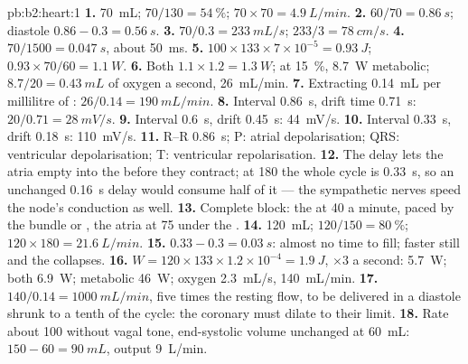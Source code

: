 \begin{solution}{pb:b2:heart:1}
\textbf{1.} \qty{70}{mL}; $70/130 = \qty{54}{\%}$; $70\times 70 =
\qty{4.9}{L/min}$.
\textbf{2.} $60/70 = \qty{0.86}{s}$; diastole $0.86 - 0.3 =
\qty{0.56}{s}$.
\textbf{3.} $70/0.3 = \qty{233}{mL/s}$; $233/3 = \qty{78}{cm/s}$.
\textbf{4.} $70/1500 = \qty{0.047}{s}$, about \qty{50}{ms}.
\textbf{5.} $100\times 133\times 7\times 10^{-5} = \qty{0.93}{J}$;
$0.93\times 70/60 = \qty{1.1}{W}$.
\textbf{6.} Both  $1.1\times 1.2 = \qty{1.3}{W}$; at
\qty{15}{\%}, \qty{8.7}{W} metabolic; $8.7/20 = \qty{0.43}{mL}$ of
oxygen a second, \qty{26}{mL/min}.
\textbf{7.} Extracting \qty{0.14}{mL} per millilitre of :
$26/0.14 = \qty{190}{mL/min}$.
\textbf{8.} Interval \qty{0.86}{s}, drift time \qty{0.71}{s}:
$20/0.71 = \qty{28}{mV/s}$.
\textbf{9.} Interval \qty{0.6}{s}, drift \qty{0.45}{s}: \qty{44}{mV/s}.
\textbf{10.} Interval \qty{0.33}{s}, drift \qty{0.18}{s}: \qty{110}{mV/s}.
\textbf{11.} R--R \qty{0.86}{s}; P: atrial depolarisation; QRS:
ventricular depolarisation; T: ventricular repolarisation.
\textbf{12.} The delay lets the atria empty into the 
before they contract; at 180 the whole cycle is \qty{0.33}{s}, so an
unchanged \qty{0.16}{s} delay would consume half of it --- the
sympathetic nerves speed the node's conduction as well.
\textbf{13.} Complete  block: the  at 40 a minute,
paced by the bundle or , the atria at 75 under the
.
\textbf{14.} \qty{120}{mL}; $120/150 = \qty{80}{\%}$; $120\times 180 =
\qty{21.6}{L/min}$.
\textbf{15.} $0.33 - 0.3 = \qty{0.03}{s}$: almost no time to fill;
faster still and the  collapses.
\textbf{16.} $W = 120\times 133\times 1.2\times 10^{-4} = \qty{1.9}{J}$,
$\times 3$ a second: \qty{5.7}{W}; both  \qty{6.9}{W};
metabolic \qty{46}{W}; oxygen \qty{2.3}{mL/s}, \qty{140}{mL/min}.
\textbf{17.} $140/0.14 = \qty{1000}{mL/min}$, five times the resting
flow, to be delivered in a diastole shrunk to a tenth of the cycle:
the coronary  must dilate to their limit.
\textbf{18.} Rate about 100 without vagal tone, end-systolic volume
unchanged at \qty{60}{mL}:  $150 - 60 = \qty{90}{mL}$,
output \qty{9}{L/min}.

\end{solution}
